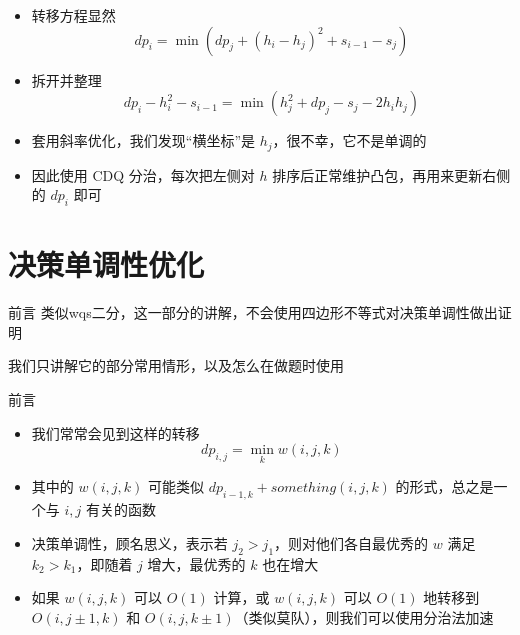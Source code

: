 ﻿\documentclass[aspectratio=169]{ctexbeamer}
\begin{document}
\begin{frame}
    \begin{itemize}
        \item 转移方程显然
        $$
        dp_i=\min\left(dp_j+(h_i-h_j)^2+s_{i-1}-s_j\right)
        $$
        \item 拆开并整理
        $$
        dp_i-h_i^2-s_{i-1}=\min\left(h_j^2+dp_j-s_j-2h_ih_j\right)
        $$
        \item 套用斜率优化，我们发现“横坐标”是 $h_j$，很不幸，它不是单调的
        \item 因此使用 CDQ 分治，每次把左侧对 $h$ 排序后正常维护凸包，再用来更新右侧的 $dp_i$ 即可
    \end{itemize}
\end{frame}






\section{决策单调性优化}

\begin{frame}{前言}
    类似wqs二分，这一部分的讲解，不会使用四边形不等式对决策单调性做出证明
    
    我们只讲解它的部分常用情形，以及怎么在做题时使用

\end{frame}

\begin{frame}{前言}
    \begin{itemize}
        \item 我们常常会见到这样的转移
        $$
            dp_{i,j}=\min_kw(i,j,k)
        $$
        \item 其中的 $w(i,j,k)$ 可能类似 $dp_{i-1,k}+something(i,j,k)$ 的形式，总之是一个与 $i,j$ 有关的函数
        \item 决策单调性，顾名思义，表示若 $j_2>j_1$，则对他们各自最优秀的 $w$ 满足 $k_2>k_1$，即随着 $j$ 增大，最优秀的 $k$ 也在增大
        \item 如果 $w(i,j,k)$ 可以 $O(1)$ 计算，或 $w(i,j,k)$ 可以 $O(1)$ 地转移到 $O(i,j\pm 1,k)$ 和 $O(i,j,k\pm 1)$（类似莫队），则我们可以使用分治法加速
        
    \end{itemize}
\end{frame}
\end{document}
